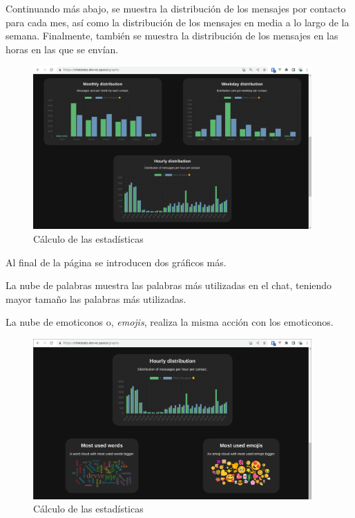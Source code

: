 Continuando más abajo, se muestra la distribución de los mensajes por contacto para cada mes, así como la distribución de los mensajes en media a lo largo de la semana. Finalmente, también se muestra la distribución de los mensajes en las horas en las que se envían.

\begin{figure}[H]
	\centering
	\includegraphics[width=0.95\textwidth]{img/study_case/step5_2.png}
	\caption{Cálculo de las estadísticas}
	\label{fig:chap5:step_5_2}
\end{figure}

Al final de la página se introducen dos gráficos más.

La nube de palabras muestra las palabras más utilizadas en el chat, teniendo mayor tamaño las palabras más utilizadas.

La nube de emoticonos o, \textit{emojis}, realiza la misma acción con los emoticonos.


\begin{figure}[H]
	\centering
	\includegraphics[width=0.95\textwidth]{img/study_case/step5_3.png}
	\caption{Cálculo de las estadísticas}
	\label{fig:chap5:step_5_3}
\end{figure}